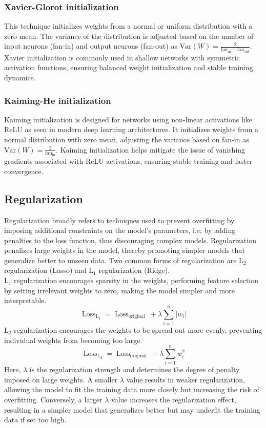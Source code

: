 \subsubsection{Xavier-Glorot initialization}
This technique \cite{glorot} initializes weights from a normal or uniform distribution with a zero mean. The variance of the distribution is adjusted based on the number of input neurons (fan-in) and output neurons (fan-out) as $\text{Var}(W) = \frac{2}{\text{fan}_{\text{in}} + \text{fan}_{\text{out}}}$. Xavier initialization is commonly used in shallow networks with symmetric activation functions, ensuring balanced weight initialization and stable training dynamics. 
\subsubsection{Kaiming-He initialization}
Kaiming initialization \cite{he2015} is designed for networks using non-linear activations like ReLU as seen in modern deep learning architectures. It initializes weights from a normal distribution with zero mean, adjusting the variance based on fan-in as $ \text{Var}(W) = \frac{2}{\text{fan}_{\text{in}}}$. Kaiming initialization helps mitigate the issue of vanishing gradients associated with ReLU activations, ensuring stable training and faster convergence.
\subsection{Regularization}
Regularization broadly refers to techniques used to prevent overfitting by imposing additional constraints on the model's parameters, i.e; by adding penalties to the loss function, thus discouraging complex models. Regularization penalizes large weights in the model, thereby promoting simpler models that generalize better to unseen data. Two common forms of regularization are L$_2$ regularization (Lasso) and L$_1$ regularization (Ridge). \\
L$_1$ regularization encourages sparsity in the weights, performing feature selection by setting irrelevant weights to zero, making the model simpler and more interpretable. 
\[ \operatorname{Loss}_{\mathrm{L}_1}=\operatorname{Loss}_{\text {original }}+\lambda \sum_{i=1}^n\left|w_i\right| \]
L$_2$ regularization encourages the weights to be spread out more evenly, preventing individual weights from becoming too large.
\[ \operatorname{Loss}_{\mathrm{L}_2}=\operatorname{Loss}_{\text {original }}+\lambda \sum_{i=1}^n w^2_i \]
Here, $\lambda$ is the regularization strength and determines the degree of penalty imposed on large weights. A smaller $\lambda$ value results in weaker regularization, allowing the model to fit the training data more closely but increasing the risk of overfitting. Conversely, a larger $\lambda$ value increases the regularization effect, resulting in a simpler model that generalizes better but may underfit the training data if set too high.
